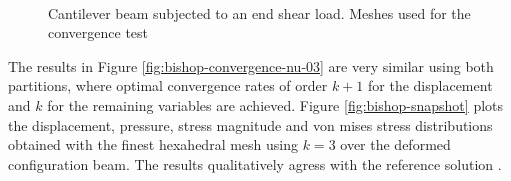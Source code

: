 \documentclass[english,11pt,3p,number,sort&compress]{elsarticle}
\begin{document}
\begin{figure}[H]
	\centering
	 \\
	\caption{Cantilever beam subjected to an end shear load. Meshes used for the convergence test}
	\label{fig:bishop-meshes}
\end{figure}

The results in Figure \ref{fig:bishop-convergence-nu-03} are very similar using both partitions, where optimal convergence rates of order $k+1$ for the displacement and $k$ for the remaining variables are achieved. Figure \ref{fig:bishop-snapshot} plots the displacement, pressure, stress magnitude and von mises stress distributions obtained with the finest hexahedral mesh using $k=3$ over the deformed configuration beam. The results qualitatively agress with the reference solution \cite{bishop2014displacement}.
\end{document}
